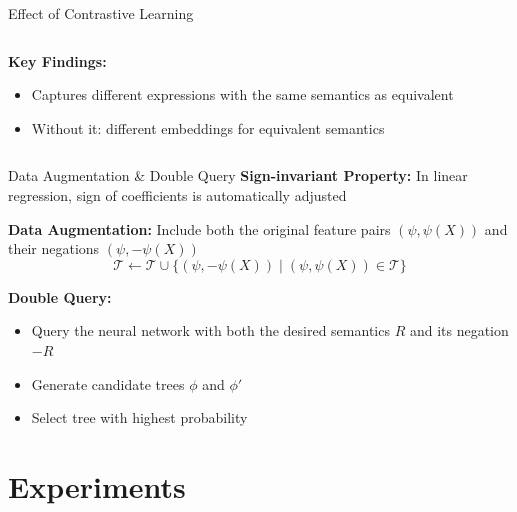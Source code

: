 \documentclass[aspectratio=1610]{beamer}
\begin{document}
\begin{frame}{Effect of Contrastive Learning}
\begin{columns}
\begin{column}{0.45\textwidth}
                \textbf{Key Findings:}
                \vspace{0.3cm}
                \begin{itemize}
                    \item Captures different expressions with the same semantics as equivalent
                    \vspace{0.2cm}
                    \item Without it: different embeddings for equivalent semantics
                    \vspace{0.2cm}
                \end{itemize}
            \end{column}
        \end{columns}
    \end{frame}

    \begin{frame}{Data Augmentation \& Double Query}
        \textbf{Sign-invariant Property:} In linear regression, sign of coefficients is automatically adjusted

        \textbf{Data Augmentation:} Include both the original feature pairs $(\psi, \psi(X))$ and their negations $(\psi, -\psi(X))$
        \begin{equation}
            \mathcal{T} \gets \mathcal{T} \cup \{(\psi, -\psi(X)) \mid (\psi, \psi(X)) \in \mathcal{T}\}
        \end{equation}

        \textbf{Double Query:}
        \begin{itemize}
            \item Query the neural network with both the desired semantics $R$ and its negation $-R$
            \item Generate candidate trees $\phi$ and $\phi'$
            \item Select tree with highest probability
        \end{itemize}

    \end{frame}


    \section{Experiments}
\end{document}
